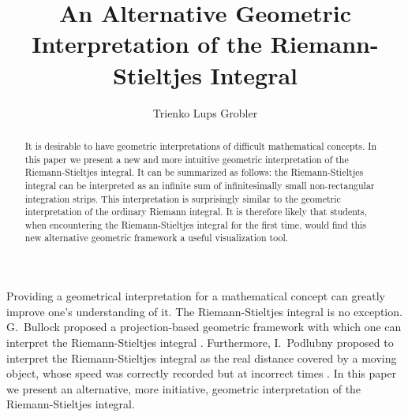 \documentclass{article}
\theoremstyle{theorem}
\theoremstyle{definition}
\begin{document}
\title{An Alternative Geometric Interpretation of the Riemann-Stieltjes Integral}
\author{Trienko Lups Grobler}

\maketitle

\begin{abstract}
It is desirable to have geometric interpretations of difficult mathematical concepts. In this paper we present a new and more intuitive geometric interpretation of the Riemann-Stieltjes integral. It can be 
summarized as follows: the Riemann-Stieltjes integral can be interpreted as an infinite sum of infinitesimally small non-rectangular 
integration strips. This interpretation is surprisingly similar to the geometric interpretation of the ordinary Riemann integral. 
It is therefore likely that students, when encountering the Riemann-Stieltjes integral for the first time, would find this new alternative geometric framework a useful visualization tool.
\end{abstract}

\noindent
Providing a geometrical interpretation for a mathematical concept can greatly improve one's understanding of it. The Riemann-Stieltjes 
integral is no exception. G.~Bullock proposed a projection-based geometric framework with which one can interpret the Riemann-Stieltjes 
integral \cite{bullock1988}. Furthermore, I.~Podlubny proposed to interpret the Riemann-Stieltjes integral as the real distance covered by a moving object, whose speed was 
correctly recorded but at incorrect times \cite{podlubny2002}. In this paper we present an alternative, more initiative, geometric interpretation of the Riemann-Stieltjes integral.\\
\end{document}
